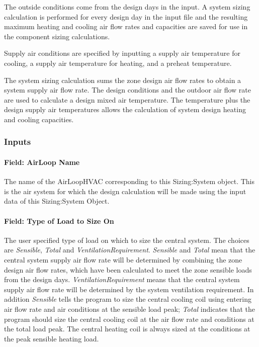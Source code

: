 The outside conditions come from the design days in the input. A system sizing calculation is performed for every design day in the input file and the resulting maximum heating and cooling air flow rates and capacities are saved for use in the component sizing calculations.

Supply air conditions are specified by inputting a supply air temperature for cooling, a supply air temperature for heating, and a preheat temperature.

The system sizing calculation sums the zone design air flow rates to obtain a system supply air flow rate. The design conditions and the outdoor air flow rate are used to calculate a design mixed air temperature. The temperature plus the design supply air temperatures allows the calculation of system design heating and cooling capacities.

\subsubsection{Inputs}\label{inputs-6-006}

\paragraph{Field: AirLoop Name}\label{field-airloop-name}

The name of the AirLoopHVAC corresponding to this Sizing:System object. This is the air system for which the design calculation will be made using the input data of this Sizing:System Object.

\paragraph{Field: Type of Load to Size On}\label{field-type-of-load-to-size-on}

The user specified type of load on which to size the central system. The choices are \emph{Sensible}, \emph{Total} and \emph{VentilationRequirement}. \emph{Sensible} and \emph{Total} mean that the central system supply air flow rate will be determined by combining the zone design air flow rates, which have been calculated to meet the zone sensible loads from the design days. \emph{VentilationRequirement} means that the central system supply air flow rate will be determined by the system ventilation requirement. In addition \emph{Sensible} tells the program to size the central cooling coil using entering air flow rate and air conditions at the sensible load peak; \emph{Total} indicates that the program should size the central cooling coil at the air flow rate and conditions at the total load peak. The central heating coil is always sized at the conditions at the peak sensible heating load.

